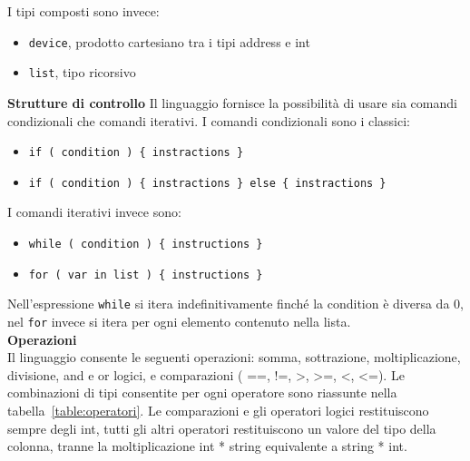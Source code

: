 \documentclass[10pt]{article}
\begin{document}
I tipi composti sono invece:
\begin{itemize}
\item \texttt{device}, prodotto cartesiano tra i tipi address e int 
\item \texttt{list}, tipo ricorsivo 
\end{itemize}

\textbf{Strutture di controllo}
Il linguaggio fornisce la possibilità di usare sia comandi condizionali che comandi iterativi. I comandi condizionali sono i classici:
\begin{itemize}
\item \texttt{if ( condition ) \{ instractions \}}
\item \texttt{if ( condition ) \{ instractions \} else \{ instractions \}}
\end{itemize}
I comandi iterativi invece sono:
\begin{itemize}
\item \texttt{while ( condition ) \{ instructions \}}
\item \texttt{for ( var in list ) \{ instructions \} }
\end{itemize}
Nell'espressione \texttt{while} si itera indefinitivamente finché la condition è diversa da 0, nel \texttt{for} invece si itera per ogni elemento contenuto nella lista.\\

\textbf{Operazioni}\\
Il linguaggio consente le seguenti operazioni: somma, sottrazione, moltiplicazione, divisione, and e or logici, e comparazioni ( ==, !=, >, >=, <, <=). Le combinazioni di tipi consentite per ogni operatore sono riassunte nella tabella~\ref{table:operatori}. Le comparazioni e gli operatori logici restituiscono sempre degli int, tutti gli altri operatori restituiscono un valore del tipo della colonna, tranne la moltiplicazione int * string equivalente a string * int. \\
\end{document}
